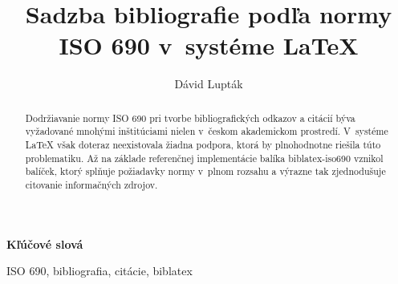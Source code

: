 \documentclass{csbulletin}
\begin{document}

\title{Sadzba bibliografie podľa normy ISO 690 v~systéme \LaTeX}
\author{Dávid Lupták}
\maketitle

\begin{abstract}
Dodržiavanie normy ISO 690 pri tvorbe bibliografických odkazov
a citácií býva vyžadované mnohými inštitúciami nielen v~českom
akademickom prostredí. V~systéme \LaTeX{} však doteraz neexistovala
žiadna podpora, ktorá by plnohodnotne riešila túto problematiku. Až
na základe referenčnej implementácie balíka \textsf{biblatex-iso690}
vznikol balíček, ktorý splňuje požiadavky normy v~plnom rozsahu
a výrazne tak zjednodušuje citovanie informačných zdrojov.
\end{abstract}

\medskip\par\textbf{Kľúčové slová}\smallskip\par
ISO 690, bibliografia, citácie, biblatex
\end{document}
